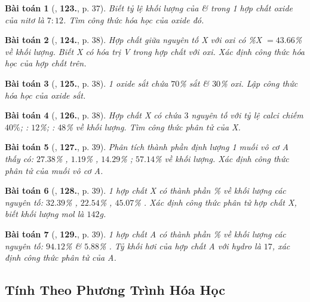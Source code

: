 \documentclass{article}
\numberwithin{equation}{section}
\newtheorem{baitoan}{Bài toán}[section]
\begin{document}
\begin{baitoan}[\cite{An2011}, \textbf{123.}, p. 37]
	Biết tỷ lệ khối lượng của  \&  trong 1 hợp chất oxide của nitơ là $7:12$. Tìm công thức hóa học của oxide đó.
\end{baitoan}

\begin{baitoan}[\cite{An2011}, \textbf{124.}, p. 38]
	Hợp chất giữa nguyên tố X với oxi có \%X $= 43.66$\% về khối lượng. Biết X có hóa trị V trong hợp chất với oxi. Xác định công thức hóa học của hợp chất trên.
\end{baitoan}

\begin{baitoan}[\cite{An2011}, \textbf{125.}, p. 38]
	1 oxide sắt chứa $70$\% sắt \& $30$\% oxi. Lập công thức hóa học của oxide sắt.
\end{baitoan}

\begin{baitoan}[\cite{An2011}, \textbf{126.}, p. 38]
	Hợp chất X có chứa $3$ nguyên tố  với tỷ lệ calci chiếm $40\%$; : $12$\%; : $48$\% về khối lượng. Tìm công thức phân tử của X.
\end{baitoan}

\begin{baitoan}[\cite{An2011}, \textbf{127.}, p. 39]
	Phân tích thành phần định lượng 1 muối vô cơ A thấy có: $27.38$\% , $1.19$\% , $14.29$\% ; $57.14$\%  về khối lượng. Xác định công thức phân tử của muối vô cơ A.
\end{baitoan}

\begin{baitoan}[\cite{An2011}, \textbf{128.}, p. 39]
	1 hợp chất X có thành phần \% về khối lượng các nguyên tố: $32.39$\% , $22.54$\% , $45.07$\% . Xác định công thức phân tử hợp chất X, biết khối lượng mol là $142$g.
\end{baitoan}

\begin{baitoan}[\cite{An2011}, \textbf{129.}, p. 39]
	1 hợp chất A có thành phần \% về khối lượng các nguyên tố: $94.12$\%  \& $5.88$\% . Tỷ khối hơi của hợp chất A với hydro là $17$, xác định công thức phân tử của A.
\end{baitoan}


\subsection{Tính Theo Phương Trình Hóa Học}
\end{document}
